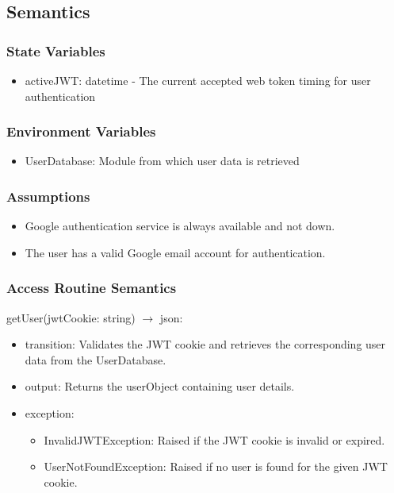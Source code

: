 \documentclass[12pt, titlepage]{article}
\begin{document}
\subsection{Semantics}

\subsubsection{State Variables}
\begin{itemize}
  \item activeJWT: datetime - The current accepted web token timing for user authentication
\end{itemize}

\subsubsection{Environment Variables}

\begin{itemize}
  \item UserDatabase: Module from which user data is retrieved
\end{itemize}

\subsubsection{Assumptions}

\begin{itemize}
  \item Google authentication service is always available and not down.
  \item The user has a valid Google email account for authentication.
\end{itemize}

\subsubsection{Access Routine Semantics}

\noindent getUser(jwtCookie: string) $\rightarrow$ json:
\begin{itemize}
\item transition: Validates the JWT cookie and retrieves the corresponding user data from the UserDatabase.
\item output: Returns the userObject containing user details.
\item exception: 
  \begin{itemize}
    \item InvalidJWTException: Raised if the JWT cookie is invalid or expired.
    \item UserNotFoundException: Raised if no user is found for the given JWT cookie.
  \end{itemize}
\end{itemize}
\end{document}
